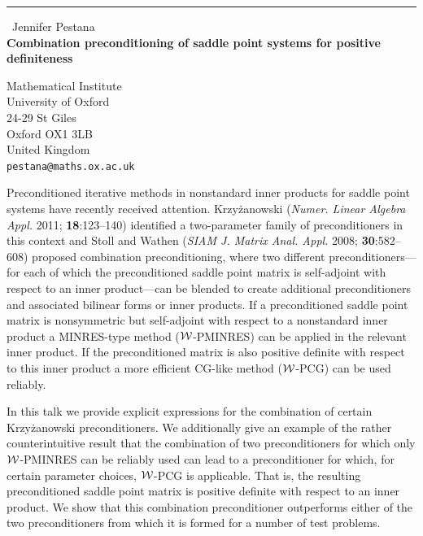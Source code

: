\documentclass{report}
\begin{document}
\begin{center}
\rule{6in}{1pt} \
{\large Jennifer Pestana \\
{\bf Combination preconditioning of saddle point systems for positive definiteness }}

Mathematical Institute \\ University of Oxford \\ 24-29 St Giles\’ \\ Oxford OX1 3LB \\ United Kingdom
\\
{\tt pestana@maths.ox.ac.uk}\end{center}

Preconditioned iterative methods in nonstandard inner products for saddle
point systems have recently received attention. Krzy\.zanowski
(\emph{Numer. Linear Algebra Appl.} 2011; {\bf18}:123--140) identified a
two-parameter family of preconditioners in this context and Stoll and
Wathen (\emph{SIAM J. Matrix Anal. Appl.} 2008; {\bf 30}:582--608)
proposed combination preconditioning, where two different
preconditioners---for each of which the preconditioned saddle point
matrix is self-adjoint with respect to an inner product---can be blended
to create additional preconditioners and associated bilinear forms or
inner products. If a preconditioned saddle point matrix is nonsymmetric
but self-adjoint with respect to a nonstandard inner product a
MINRES-type method ($\cal W$-PMINRES) can be applied in the relevant
inner product. If the preconditioned matrix is also positive definite
with respect to this inner product a more efficient CG-like method ($\cal
W$-PCG) can be used reliably.

In this talk we provide explicit expressions for the combination of
certain Krzy\.{z}anowski preconditioners. We additionally give an example
of the rather counterintuitive result that the combination of two
preconditioners for which only $\cal W$-PMINRES can be reliably used can
lead to a preconditioner for which, for certain parameter choices, $\cal
W$-PCG is applicable. That is, the resulting preconditioned saddle point
matrix is positive definite with respect to an inner product. We show
that this combination preconditioner outperforms either of the two
preconditioners from which it is formed for a number of test problems.
\end{document}

